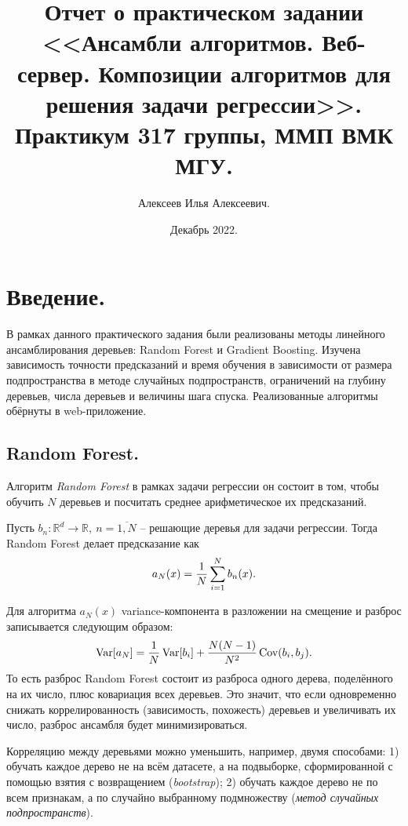 \documentclass[12pt]{extarticle}
\title{Отчет о практическом задании \\ <<Ансамбли алгоритмов. Веб-сервер. Композиции алгоритмов для решения задачи регрессии>>.\\[6mm] \large Практикум 317 группы, ММП ВМК МГУ.}
\author{Алексеев Илья Алексеевич.}
\date{Декабрь 2022.}
\newcommand{\R}{\mathbb{R}}
\DeclareMathOperator{\var}{\text{Var}}
\DeclareMathOperator{\cov}{\text{Cov}}
\begin{document}
\maketitle

\tableofcontents

\newpage

\section{Введение.}

В рамках данного практического задания были реализованы методы линейного ансамблирования деревьев: Random Forest и Gradient Boosting. Изучена зависимость точности предсказаний и время обучения в зависимости от размера подпространства в методе случайных подпространств, ограничений на глубину деревьев, числа деревьев и величины шага спуска. Реализованные алгоритмы обёрнуты в web-приложение.

\subsection{Random Forest.}

Алгоритм \textit{Random Forest} \cite{lin} в рамках задачи регрессии он состоит в том, чтобы обучить $N$ деревьев и посчитать среднее арифметическое их предсказаний.

Пусть $b_n:\R^d\to\R,\ n=\overline{1,N}$ -- решающие деревья для задачи регрессии. Тогда Random Forest делает предсказание как
\begin{equation*}
    a_N(x)={1\over N}\sum_{i=1}^Nb_n(x).
\end{equation*}

Для алгоритма $a_N(x)$ variance-компонента в разложении на смещение и разброс записывается следующим образом:
\begin{equation}\label{eq:var}
    \var[a_N]={1\over N}\var[b_i]+{N(N-1)\over N^2}\cov(b_i,b_j).
\end{equation}
То есть разброс Random Forest состоит из разброса одного дерева, поделённого на их число, плюс ковариация всех деревьев. Это значит, что если одновременно снижать коррелированность (зависимость, похожесть) деревьев и увеличивать их число, разброс ансамбля будет минимизироваться.

Корреляцию между деревьями можно уменьшить, например, двумя способами: 1) обучать каждое дерево не на всём датасете, а на подвыборке, сформированной с помощью взятия с возвращением (\textit{bootstrap}); 2) обучать каждое дерево не по всем признакам, а по случайно выбранному подмножеству (\textit{метод случайных подпространств}).
\end{document}
